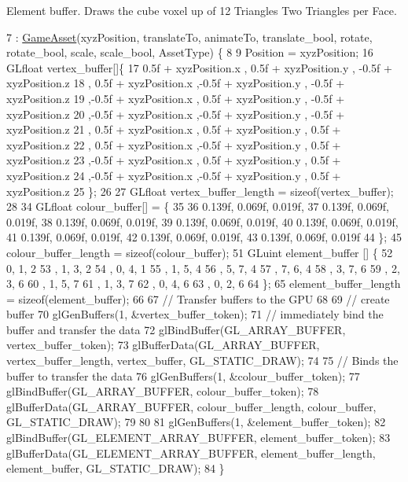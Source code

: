 Element buffer. Draws the cube voxel up of 12 Triangles Two Triangles per Face.
\begin{DoxyCode}
7 : \hyperlink{class_game_asset_a9de932075d9b4263e7fb24fbfd163a61}{GameAsset}(xyzPosition, translateTo, animateTo, translate\_bool, rotate, rotate\_bool, scale, 
      scale\_bool, AssetType) \{
8 
9   Position = xyzPosition;
16   GLfloat vertex\_buffer[]\{
17       0.5f + xyzPosition.x  , 0.5f + xyzPosition.y  , -0.5f + xyzPosition.z
18     , 0.5f + xyzPosition.x  ,-0.5f + xyzPosition.y  , -0.5f + xyzPosition.z
19     ,-0.5f + xyzPosition.x  , 0.5f + xyzPosition.y  , -0.5f + xyzPosition.z
20     ,-0.5f + xyzPosition.x  ,-0.5f + xyzPosition.y  , -0.5f + xyzPosition.z
21     , 0.5f + xyzPosition.x  , 0.5f + xyzPosition.y  ,  0.5f + xyzPosition.z 
22     , 0.5f + xyzPosition.x  ,-0.5f + xyzPosition.y  ,  0.5f + xyzPosition.z
23     ,-0.5f + xyzPosition.x  , 0.5f + xyzPosition.y  ,  0.5f + xyzPosition.z
24     ,-0.5f + xyzPosition.x  ,-0.5f + xyzPosition.y  ,  0.5f + xyzPosition.z
25   \};
26 
27   GLfloat vertex\_buffer\_length = \textcolor{keyword}{sizeof}(vertex\_buffer);
28 
34   GLfloat colour\_buffer[] = \{
35 
36      0.139f, 0.069f, 0.019f,
37      0.139f, 0.069f, 0.019f,
38      0.139f, 0.069f, 0.019f,
39      0.139f, 0.069f, 0.019f,
40      0.139f, 0.069f, 0.019f,
41      0.139f, 0.069f, 0.019f,
42      0.139f, 0.069f, 0.019f,
43      0.139f, 0.069f, 0.019f
44   \};
45   colour\_buffer\_length = \textcolor{keyword}{sizeof}(colour\_buffer);
51   GLuint element\_buffer []  \{
52       0, 1, 2   
53     , 1, 3, 2
54     , 0, 4, 1   
55     , 1, 5, 4   
56     , 5, 7, 4   
57     , 7, 6, 4   
58     , 3, 7, 6   
59     , 2, 3, 6   
60     , 1, 5, 7   
61     , 1, 3, 7   
62     , 0, 4, 6   
63     , 0, 2, 6   
64   \};
65   element\_buffer\_length = \textcolor{keyword}{sizeof}(element\_buffer);
66 
67   \textcolor{comment}{// Transfer buffers to the GPU}
68 
69   \textcolor{comment}{// create buffer}
70   glGenBuffers(1, &vertex\_buffer\_token);
71   \textcolor{comment}{// immediately bind the buffer and transfer the data}
72   glBindBuffer(GL\_ARRAY\_BUFFER, vertex\_buffer\_token);
73   glBufferData(GL\_ARRAY\_BUFFER, vertex\_buffer\_length, vertex\_buffer, GL\_STATIC\_DRAW);
74   
75   \textcolor{comment}{// Binds the buffer to transfer the data}
76   glGenBuffers(1, &colour\_buffer\_token);
77   glBindBuffer(GL\_ARRAY\_BUFFER, colour\_buffer\_token);
78   glBufferData(GL\_ARRAY\_BUFFER, colour\_buffer\_length, colour\_buffer, GL\_STATIC\_DRAW);
79 
80 
81   glGenBuffers(1, &element\_buffer\_token);
82   glBindBuffer(GL\_ELEMENT\_ARRAY\_BUFFER, element\_buffer\_token);
83   glBufferData(GL\_ELEMENT\_ARRAY\_BUFFER, element\_buffer\_length, element\_buffer, GL\_STATIC\_DRAW);
84 \}
\end{DoxyCode}
\hypertarget{class_cube_asset_ab3ab9a5da82cbf8537a28652410093b1}{}
